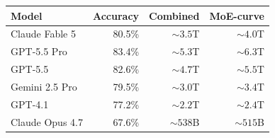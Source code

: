 \begin{tabular}{lrrr}
\toprule
Model & Accuracy & Combined & MoE-curve \\
\midrule
Claude Fable 5 & 80.5\% & ${\sim}3.5$T & ${\sim}4.0$T \\
GPT-5.5 Pro & 83.4\% & ${\sim}5.3$T & ${\sim}6.3$T \\
GPT-5.5 & 82.6\% & ${\sim}4.7$T & ${\sim}5.5$T \\
Gemini 2.5 Pro & 79.5\% & ${\sim}3.0$T & ${\sim}3.4$T \\
GPT-4.1 & 77.2\% & ${\sim}2.2$T & ${\sim}2.4$T \\
Claude Opus 4.7 & 67.6\% & ${\sim}538$B & ${\sim}515$B \\
\bottomrule
\end{tabular}
